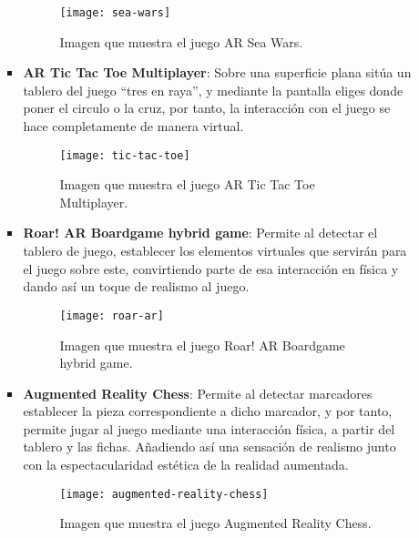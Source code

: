 \begin{itemize}
\begin{itemize}
\begin{itemize}
  \begin{figure}[h]
    \centering
    \texttt{[image: sea-wars]}
    \caption{Imagen que muestra el juego AR Sea Wars.\protect\footnotemark}
    \label{figura-sea-wars}
  \end{figure}


  \item \textbf{AR Tic Tac Toe Multiplayer}: Sobre una superficie plana sitúa un tablero del juego “tres en raya”, y mediante la pantalla eliges donde poner el circulo o la cruz, por tanto, la interacción con el juego se hace completamente de manera virtual.

  \begin{figure}[h]
    \centering
    \texttt{[image: tic-tac-toe]}
    \caption{Imagen que muestra el juego AR Tic Tac Toe Multiplayer.\protect\footnotemark}
    \label{figura-tic-tac-toe}
  \end{figure}


  \newpage

  \item \textbf{Roar! AR Boardgame hybrid game}: Permite al detectar el tablero de juego, establecer los elementos virtuales que servirán para el juego sobre este, convirtiendo parte de esa interacción en física y dando así un toque de realismo al juego.

  \begin{figure}[h]
    \centering
    \texttt{[image: roar-ar]}
    \caption{Imagen que muestra el juego Roar! AR Boardgame hybrid game.\protect\footnotemark}
    \label{figura-roar-ar}
  \end{figure}


  \item \textbf{Augmented Reality Chess}: Permite al detectar marcadores establecer la pieza correspondiente a dicho marcador, y por tanto, permite jugar al juego mediante una interacción física, a partir del tablero y las fichas. Añadiendo así una sensación de realismo junto con la espectacularidad estética de la realidad aumentada.

  \begin{figure}[h]
    \centering
    \texttt{[image: augmented-reality-chess]}
    \caption{Imagen que muestra el juego Augmented Reality Chess.\protect\footnotemark}
    \label{figura-augmented-reality-chess}
  \end{figure}


\end{itemize}
\end{itemize}
\end{itemize}
